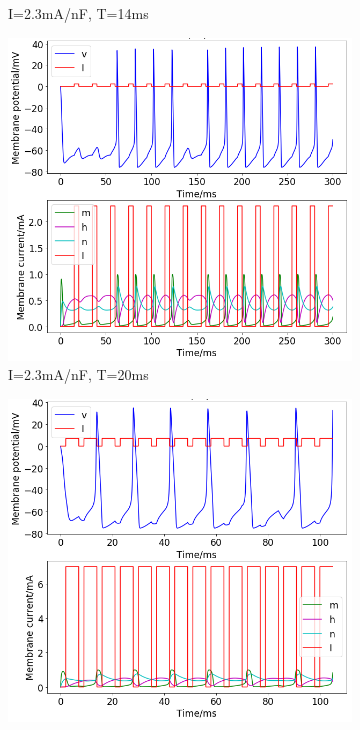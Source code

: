 \documentclass[twoside,twocolumn]{article}
\begin{document}
\begin{figure}[h]
\begin{subfigure}[t]{0.49\textwidth}
  \caption{I=2.3mA/nF, T=14ms}
  \label{sub:2b23-14}
  \end{subfigure}
\newline
  \begin{subfigure}[t]{0.49\textwidth}
    \includegraphics[width=\linewidth]{23-20}
  \caption{I=2.3mA/nF, T=20ms}
  \label{sub:2b23-20}
  \end{subfigure}
  \begin{subfigure}[t]{0.49\textwidth}
    \includegraphics[width=\linewidth]{7-7}

\end{subfigure}
\end{figure}
\end{document}
